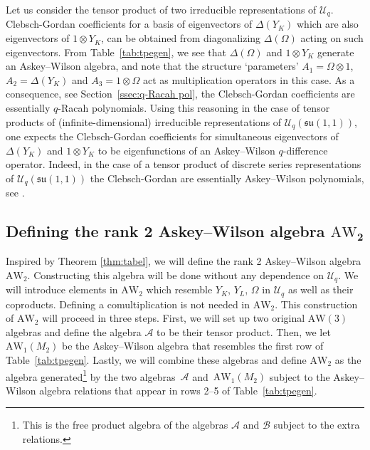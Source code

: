 \documentclass[10pt,a4paper]{amsart}
\numberwithin{equation}{section}
\newcommand{\aw}{\mathrm{AW}\!\left(3\right)}
\newcommand{\awc}[2]{\mathrm{AW}_{#1}\!\left(#2\right)}
\newcommand{\AW}[1]{\mathrm{AW}_{#1}}
\newcommand{\bivariateawalgebra}{rank 2 Askey--Wilson algebra }
\newcommand{\Uq}{\mathcal{U}_q}
\begin{document}
\begin{Remark}
	Let us consider the tensor product of two irreducible representations of $\mathcal U_q$. Clebsch-Gordan coefficients for a basis of eigenvectors of $\Delta(Y_K)$ which are also eigenvectors of $1 \otimes Y_K$, can be obtained from diagonalizing $\Delta(\Omega)$ acting on such eigenvectors. From Table~\ref{tab:tpegen}, we see that $\Delta(\Omega)$ and $1 \otimes Y_K$ generate an Askey--Wilson algebra, and note that the structure `parameters' $A_1=\Omega\otimes 1$, $A_2=\Delta(Y_K)$ and $A_3=1\otimes \Omega$ act as multiplication operators in this case. As a consequence, see Section~\ref{ssec:q-Racah pol}, the Clebsch-Gordan coefficients are essentially $q$-Racah polynomials. Using this reasoning in the case of tensor products of (infinite-dimensional) irreducible representations of $\mathcal U_q(\mathfrak{su}(1,1))$, one expects the Clebsch-Gordan coefficients for simultaneous eigenvectors of $\Delta(Y_K)$ and $1\otimes Y_K$ to be eigenfunctions of an Askey--Wilson $q$-difference operator. Indeed, in the case of a tensor product of discrete series representations of $\mathcal U_q(\mathfrak{su}(1,1))$ the Clebsch-Gordan are essentially Askey--Wilson polynomials, see \cite{Groenevelt2004, KvdJ}.
\end{Remark}

\subsection[Defining the rank 2 Askey-Wilson algebra AW\_2]{Defining the \bivariateawalgebra $\boldsymbol{\AW{2}}$}

Inspired by Theorem \ref{thm:tabel}, we will define the \bivariateawalgebra $\AW{2}$. Constructing this algebra will be done without any dependence on $\Uq$. We will introduce elements in $\AW{2}$ which resemble $Y_K$, $Y_L$, $\Omega$ in $\Uq$ as well as their coproducts. Defining a comultiplication is not needed in $\AW{2}$. This construction of $\AW{2}$ will proceed in three steps. First, we will set up two original $\aw$ algebras and define the algebra $\mathscr{A}$ to be their tensor product. Then, we let $\awc{1}{M_2}$ be the Askey--Wilson algebra that resembles the first row of Table~\ref{tab:tpegen}. Lastly, we will combine these algebras and define $\AW{2}$ as the algebra generated\footnote{This is the free product algebra of the algebras $\mathscr{A}$ and $\mathscr{B}$ subject to the extra relations.} by the two algebras~$\mathscr{A}$ and~$\awc{1}{M_2}$ subject to the Askey--Wilson algebra relations that appear in rows 2--5 of Table~\ref{tab:tpegen}.
\end{document}

